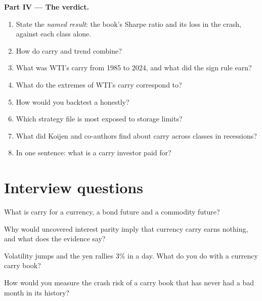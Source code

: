 \begin{problem}
\medskip\noindent\textbf{Part IV --- The verdict.}
\begin{enumerate}[resume]
\item State the \emph{named result}: the  book's Sharpe ratio and its loss in the crash, against each class alone.
\item How do carry and trend combine?
\item What was WTI's carry from 1985 to 2024, and what did the sign rule earn?
\item What do the extremes of WTI's carry correspond to?
\item How would you backtest a  honestly?
\item Which strategy file is most exposed to storage limits?
\item What did Koijen and co-authors find about carry across classes in recessions?
\item In one sentence: what is a carry investor paid for?
\end{enumerate}
\end{problem}

\section{Interview questions}

\begin{interviewq}\label{iq:s1:carry-across-asset-classes:1}
What is carry for a currency, a bond future and a commodity future?
\end{interviewq}

\begin{interviewq}\label{iq:s1:carry-across-asset-classes:2}
Why would uncovered interest parity imply that currency carry earns nothing, and what does the evidence say?
\end{interviewq}

\begin{interviewq}\label{iq:s1:carry-across-asset-classes:3}
Volatility jumps and the yen rallies 3\% in a day. What do you do with a currency carry book?
\end{interviewq}

\begin{interviewq}\label{iq:s1:carry-across-asset-classes:4}
How would you measure the crash risk of a carry book that has never had a bad month in its history?
\end{interviewq}

